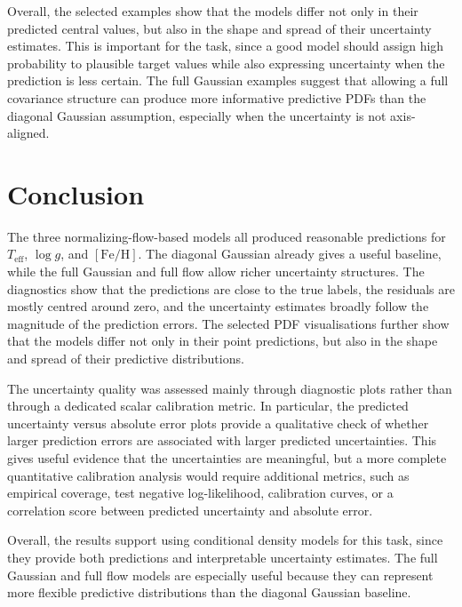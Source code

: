 Overall, the selected examples show that the models differ not only in their predicted central values, but also in the shape and spread of their uncertainty estimates. This is important for the task, since a good model should assign high probability to plausible target values while also expressing uncertainty when the prediction is less certain. The full Gaussian examples suggest that allowing a full covariance structure can produce more informative predictive PDFs than the diagonal Gaussian assumption, especially when the uncertainty is not axis-aligned.

\section{Conclusion}

The three normalizing-flow-based models all produced reasonable predictions for $T_{\mathrm{eff}}$, $\log g$, and $[\mathrm{Fe}/\mathrm{H}]$. The diagonal Gaussian already gives a useful baseline, while the full Gaussian and full flow allow richer uncertainty structures. The diagnostics show that the predictions are close to the true labels, the residuals are mostly centred around zero, and the uncertainty estimates broadly follow the magnitude of the prediction errors. The selected PDF visualisations further show that the models differ not only in their point predictions, but also in the shape and spread of their predictive distributions.

The uncertainty quality was assessed mainly through diagnostic plots rather than through a dedicated scalar calibration metric. In particular, the predicted uncertainty versus absolute error plots provide a qualitative check of whether larger prediction errors are associated with larger predicted uncertainties. This gives useful evidence that the uncertainties are meaningful, but a more complete quantitative calibration analysis would require additional metrics, such as empirical coverage, test negative log-likelihood, calibration curves, or a correlation score between predicted uncertainty and absolute error.

Overall, the results support using conditional density models for this task, since they provide both predictions and interpretable uncertainty estimates. The full Gaussian and full flow models are especially useful because they can represent more flexible predictive distributions than the diagonal Gaussian baseline.
\printbibliography


